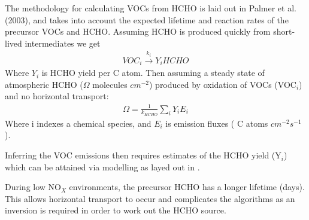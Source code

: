 The methodology for calculating VOCs from HCHO is laid out in Palmer et al. (2003), and takes into account the expected lifetime and reaction rates of the precursor VOCs and HCHO.
Assuming HCHO is produced quickly from short-lived intermediates we get
\begin{eqnarray*}
VOC_i \overset{k_i}{\rightarrow} Y_i HCHO
\end{eqnarray*}
Where $Y_i$ is HCHO yield per C atom.
Then assuming a steady state of atmospheric HCHO ($\Omega$ molecules $cm^{-2}$) produced by oxidation of VOCs (VOC$_i$) and no horizontal transport:
\begin{eqnarray*}
\Omega = \frac{1}{k_{HCHO}} \sum_{i} Y_i E_i
\end{eqnarray*}
Where i indexes a chemical species, and $E_i$ is emission fluxes ( C atoms $cm^{-2}s^{-1}$).

Inferring the VOC emissions then requires estimates of the HCHO yield (Y$_i$) which can be attained via modelling as layed out in \citet{Millet_2006}.

During low NO$_X$ environments, the precursor HCHO has a longer lifetime (days).
This allows horizontal transport to occur and complicates the algorithms as an inversion is required in order to work out the HCHO source.
